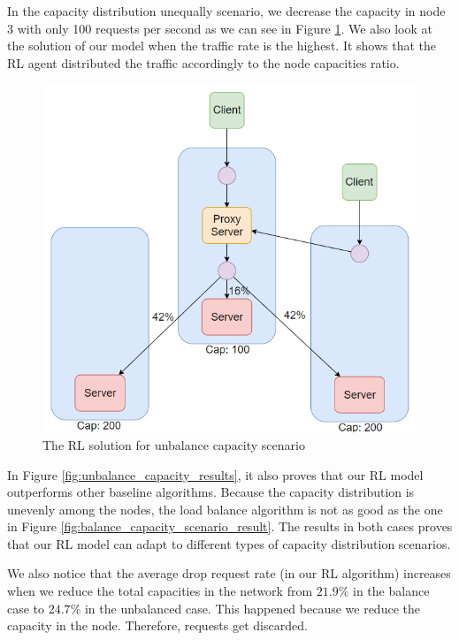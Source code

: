 \documentclass[conference]{IEEEtran}
\begin{document}
In the capacity distribution unequally scenario, we decrease the capacity in node 3 with only 100 requests per second as we can see in Figure \ref{fig:unbalance_capacity_RL_solution}. We also look at the solution of our model when the traffic rate is the highest. It shows that the RL agent distributed the traffic accordingly to the node capacities ratio.

\begin{figure}[]
    \centering
    \includegraphics[scale = 0.5]{imgs/unbalance_capacity_RL_solution.png}
    \caption{The RL solution for unbalance capacity scenario}
    \label{fig:unbalance_capacity_RL_solution}
\end{figure}

In Figure \ref{fig:unbalance_capacity_results}, it also proves that our RL model outperforms other baseline algorithms. Because the capacity distribution is unevenly among the nodes, the load balance algorithm is not as good as the one in Figure \ref{fig:balance_capacity_scenario_result}. The results in both cases proves that our RL model can adapt to different types of capacity distribution scenarios.

We also notice that the average drop request rate (in our RL algorithm) increases when we reduce the total capacities in the network from $21.9\%$ in the balance case to $24.7\%$ in the unbalanced case. This happened because we reduce the capacity in the node. Therefore, requests get discarded.
\end{document}
